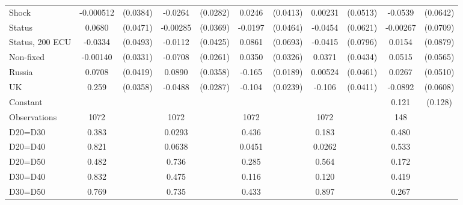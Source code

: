 \begin{tabular}{l|cccccccc|cc}
Shock         &-0.000512         & (0.0384)&  -0.0264         & (0.0282)&   0.0246         & (0.0413)&  0.00231         & (0.0513)&  -0.0539         & (0.0642)\\
Status        &   0.0680         & (0.0471)& -0.00285         & (0.0369)&  -0.0197         & (0.0464)&  -0.0454         & (0.0621)& -0.00267         & (0.0709)\\
Status, 200 ECU&  -0.0334         & (0.0493)&  -0.0112         & (0.0425)&   0.0861         & (0.0693)&  -0.0415         & (0.0796)&   0.0154         & (0.0879)\\
Non-fixed     & -0.00140         & (0.0331)&  -0.0708\sym{***}& (0.0261)&   0.0350         & (0.0326)&   0.0371         & (0.0434)&   0.0515         & (0.0565)\\
Russia        &   0.0708\sym{*}  & (0.0419)&   0.0890\sym{**} & (0.0358)&   -0.165\sym{***}& (0.0189)&  0.00524         & (0.0461)&   0.0267         & (0.0510)\\
UK            &    0.259\sym{***}& (0.0358)&  -0.0488\sym{*}  & (0.0287)&   -0.104\sym{***}& (0.0239)&   -0.106\sym{**} & (0.0411)&  -0.0892         & (0.0608)\\
Constant        &                  &         &                  &         &                  &         &                  &         &    0.121         &  (0.128)\\
\hline
Observations    &     1072         &         &     1072         &         &     1072         &         &     1072         &         &      148         &         \\
D20=D30         &    0.383         &         &   0.0293         &         &    0.436         &         &    0.183         &         &    0.480         &         \\
D20=D40         &    0.821         &         &   0.0638         &         &   0.0451         &         &   0.0262         &         &    0.533         &         \\
D20=D50         &    0.482         &         &    0.736         &         &    0.285         &         &    0.564         &         &    0.172         &         \\
D30=D40         &    0.832         &         &    0.475         &         &    0.116         &         &    0.120         &         &    0.419         &         \\
D30=D50         &    0.769         &         &    0.735         &         &    0.433         &         &    0.897         &         &    0.267         &         \\

\end{tabular}
